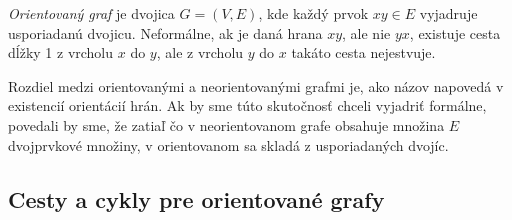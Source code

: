 \textit{Orientovaný graf} je dvojica $G = (V, E)$, kde každý prvok $xy \in E$ vyjadruje usporiadanú dvojicu. Neformálne, ak je daná hrana $xy$, ale nie $yx$, existuje cesta dĺžky 1 z vrcholu $x$ do $y$, ale z vrcholu $y$ do $x$ takáto cesta nejestvuje.\newline

Rozdiel medzi orientovanými a neorientovanými grafmi je, ako názov napovedá v existencií orientácií hrán. Ak by sme túto skutočnosť chceli vyjadriť formálne, povedali by sme, že zatiaľ čo v neorientovanom grafe obsahuje množina $E$ dvojprvkové množiny, v orientovanom sa skladá z usporiadaných dvojíc.\newline


\subsection{Cesty a cykly pre orientované grafy}


